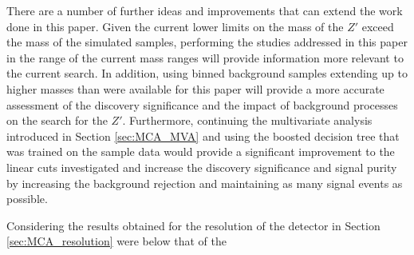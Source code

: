 \documentclass{article}
\begin{document}
There are a number of further ideas and improvements that can extend the work done in this paper. Given the current lower limits on the mass of the $Z'$ exceed the mass of the simulated samples, performing the studies addressed in this paper in the range of the current mass ranges will provide information more relevant to the current search. 
In addition, using binned background samples extending up to higher masses than were available for this paper will provide a more accurate assessment of the discovery significance and the impact of background processes on the search for the $Z'$. 
Furthermore, continuing the multivariate analysis introduced in Section \ref{sec:MCA_MVA} and using the boosted decision tree that was trained on the sample data would provide a significant improvement to the linear cuts investigated and increase the discovery significance and signal purity by increasing the background rejection and maintaining as many signal events as possible.

Considering the results obtained for the resolution of the detector in Section \ref{sec:MCA_resolution} were below that of the 




\end{document}
